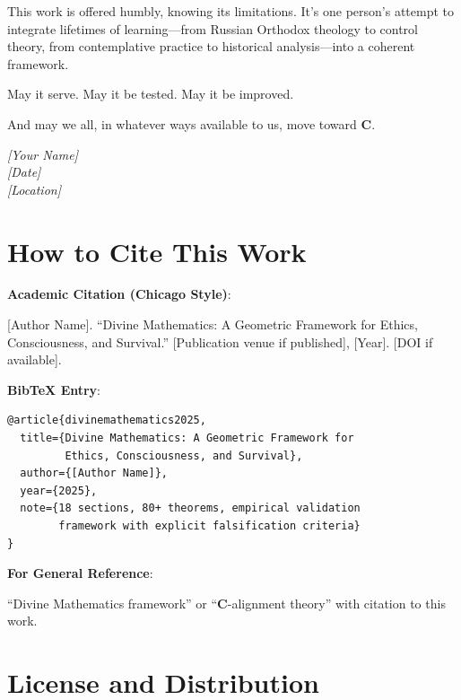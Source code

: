 \documentclass[11pt,a4paper]{article}
\theoremstyle{definition}
\theoremstyle{remark}
\begin{document}
\begin{small}
\begin{enumerate}
\begin{protocol}
This work is offered humbly, knowing its limitations. It's one person's attempt to integrate lifetimes of learning—from Russian Orthodox theology to control theory, from contemplative practice to historical analysis—into a coherent framework.

May it serve. May it be tested. May it be improved.

And may we all, in whatever ways available to us, move toward \(\mathbf{C}\).

\vspace{1em}

\begin{flushright}
\textit{[Your Name]}\\
\textit{[Date]}\\
\textit{[Location]}
\end{flushright}

\vspace{2em}

\section*{How to Cite This Work}

\textbf{Academic Citation (Chicago Style)}:

[Author Name]. ``Divine Mathematics: A Geometric Framework for Ethics, Consciousness, and Survival.'' [Publication venue if published], [Year]. [DOI if available].

\textbf{BibTeX Entry}:

\begin{verbatim}
@article{divinemathematics2025,
  title={Divine Mathematics: A Geometric Framework for 
         Ethics, Consciousness, and Survival},
  author={[Author Name]},
  year={2025},
  note={18 sections, 80+ theorems, empirical validation 
        framework with explicit falsification criteria}
}
\end{verbatim}

\textbf{For General Reference}:

``Divine Mathematics framework'' or ``\(\mathbf{C}\)-alignment theory'' with citation to this work.

\vspace{2em}

\section*{License and Distribution}


\end{protocol}
\end{enumerate}
\end{small}
\end{document}
